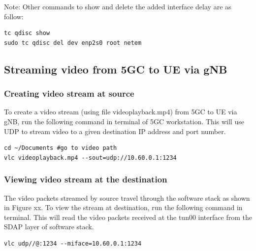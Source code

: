 Note: Other commands to show and delete the added interface delay are as follow:
\begin{lstlisting}
tc qdisc show
sudo tc qdisc del dev enp2s0 root netem
\end{lstlisting}

\subsection{Streaming video from 5GC to UE via gNB}
\subsubsection{Creating video stream at source}
To create a video stream (using file videoplayback.mp4) from 5GC to UE via gNB, run the following command in terminal of 5GC workstation. This will use UDP to stream video to a given destination IP address and port number.
\begin{lstlisting}
cd ~/Documents #go to video path
vlc videoplayback.mp4 --sout=udp://10.60.0.1:1234
\end{lstlisting}
\subsubsection{Viewing video stream at the destination}
The video packets streamed by source travel through the software stack as shown in Figure xx.
To view the stream at destination, run the following command in terminal. This will read the video packets received at the tun00 interface from the SDAP layer of software stack.
\begin{lstlisting}
vlc udp//@:1234 --miface=10.60.0.1:1234
\end{lstlisting}

